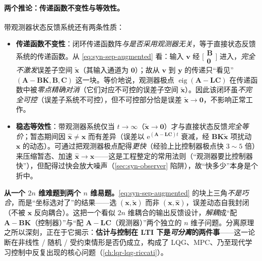 \paragraph{两个推论：传递函数不变性与等效性。}
带观测器状态反馈系统还有两条性质\cite{liubao2006modern}：
\begin{itemize}
  \item \textbf{传递函数不变性}：闭环传递函数阵\emph{与是否采用观测器无关}，等于直接状态反馈系统的传递函数。从 \cref{eq:syn-sep-augmented} 看：输入 $\mathbf v$ 经 $\big[\begin{smallmatrix}\mathbf B\\\mathbf 0\end{smallmatrix}\big]$ 进入，\emph{完全不激发}误差子空间 $\tilde{\mathbf x}$（其输入通道为 $\mathbf 0$）；故从 $\mathbf v$ 到 $\mathbf y$ 的传递只“看见” $(\mathbf A-\mathbf B\mathbf K,\mathbf B,\mathbf C)$ 这一块。等价地说，观测器极点 $\operatorname{eig}(\mathbf A-\mathbf L\mathbf C)$ 在传递函数中被\emph{零点精确对消}（它们对应不可控的误差子空间 $\tilde{\mathbf x}$）。因此该闭环虽\emph{不完全可控}（误差子系统不可控），但不可控部分恰是误差 $\tilde{\mathbf x}\to\mathbf 0$，不影响正常工作。
  \item \textbf{稳态等效性}：带观测器系统仅当 $t\to\infty$（$\tilde{\mathbf x}\to\mathbf 0$）才与直接状态反馈\emph{完全等价}；暂态期间因 $\hat{\mathbf x}\neq\mathbf x$ 而有差异（误差以 $\mathrm e^{(\mathbf A-\mathbf L\mathbf C)t}$ 衰减，经 $\mathbf B\mathbf K\tilde{\mathbf x}$ 项扰动 $\mathbf x$ 的动态）。可通过把观测器极点配得\emph{更快}（经验上比控制器极点快 $3\sim5$ 倍）来压缩暂态、加速 $\hat{\mathbf x}\to\mathbf x$——这是工程整定的常用法则（“观测器要比控制器快”），但配得过快会放大噪声（\cref{sec:syn-observer} 陷阱），故“快多少”本身是个折中。
\end{itemize}

\begin{insight}
\textbf{从一个 $2n$ 维难题到两个 $n$ 维易题。}\;\cref{eq:syn-sep-augmented} 的块上三角\emph{不是巧合}，而是“坐标选对了”的结果——选 $(\mathbf x,\tilde{\mathbf x})$ 而非 $(\mathbf x,\hat{\mathbf x})$，误差动态自我封闭（不被 $\mathbf x$ 反向耦合）。这把一个看似 $2n$ 维耦合的输出反馈设计，\emph{解耦}成“配 $\mathbf A-\mathbf B\mathbf K$（控制器）”与“配 $\mathbf A-\mathbf L\mathbf C$（观测器）”两个独立的 $n$ 维子问题。分离原理之所以深刻，正在于它揭示：\textbf{估计与控制在 LTI 下是\emph{可分离}的两件事}——这一论断在非线性 / 随机 / 受约束情形是否仍成立，构成了 LQG、MPC、乃至现代学习控制中反复出现的核心问题（\cref{ch:lqr-lqg-riccati}）。
\end{insight}


